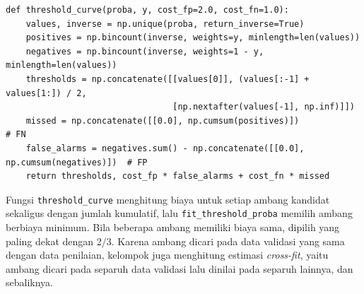 \begin{lstlisting}[emph={threshold_curve,fit_threshold_proba},caption={Pencarian ambang dengan biaya minimum (\texttt{src/cost\_sensitive.py})},label={lst:cost}]
def threshold_curve(proba, y, cost_fp=2.0, cost_fn=1.0):
    values, inverse = np.unique(proba, return_inverse=True)
    positives = np.bincount(inverse, weights=y, minlength=len(values))
    negatives = np.bincount(inverse, weights=1 - y, minlength=len(values))
    thresholds = np.concatenate([[values[0]], (values[:-1] + values[1:]) / 2,
                                 [np.nextafter(values[-1], np.inf)]])
    missed = np.concatenate([[0.0], np.cumsum(positives)])                 # FN
    false_alarms = negatives.sum() - np.concatenate([[0.0], np.cumsum(negatives)])  # FP
    return thresholds, cost_fp * false_alarms + cost_fn * missed
\end{lstlisting}

Fungsi \texttt{threshold\_curve} menghitung biaya untuk setiap ambang kandidat sekaligus dengan jumlah kumulatif, lalu \texttt{fit\_threshold\_proba} memilih ambang berbiaya minimum. Bila beberapa ambang memiliki biaya sama, dipilih yang paling dekat dengan 2/3. Karena ambang dicari pada data validasi yang sama dengan data penilaian, kelompok juga menghitung estimasi \textit{cross-fit}, yaitu ambang dicari pada separuh data validasi lalu dinilai pada separuh lainnya, dan sebaliknya.

\begin{table}[htbp]
    \centering
    \small
    \setlength{\tabcolsep}{3.5pt}
    \caption{Biaya total $2\,FP+FN$ sebelum dan sesudah penyesuaian ambang pada data validasi.}
    \label{tab:cost}
\end{table}

